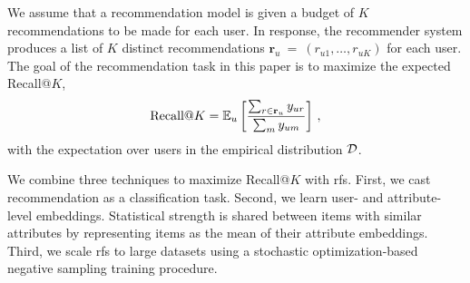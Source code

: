 We assume that a recommendation model is given a budget of $K$ recommendations to be made for each user. In response, the recommender system produces a list of $K$ distinct recommendations $\mathbf{r}_u~=~(r_{u1}, \ldots, r_{uK})$ for each user. The goal of the recommendation task in this paper is to maximize the expected Recall@$K$,
\begin{equation}
\textrm{Recall}@K = \mathbb{E}_{u}\left[\frac{\sum_{r \in \mathbf{r}_u} y_{ur}}{\sum_{m} y_{um}}\right]\, ,
\label{eq:recall}
\end{equation}
with the expectation over users in the empirical distribution $\mathcal{D}$.

We combine three techniques to maximize Recall@$K$ with \gls{rfs}. First, we cast recommendation as a classification task. Second, we learn user- and attribute-level embeddings. Statistical strength is shared between items with similar attributes by representing items as the mean of their attribute embeddings. Third, we scale \gls{rfs} to large datasets using a stochastic optimization-based negative sampling training procedure.

